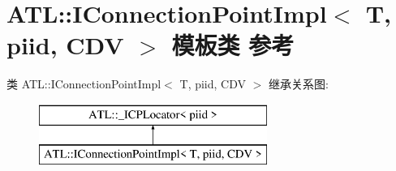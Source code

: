 \hypertarget{class_a_t_l_1_1_i_connection_point_impl}{}\section{A\+TL\+:\+:I\+Connection\+Point\+Impl$<$ T, piid, C\+DV $>$ 模板类 参考}
\label{class_a_t_l_1_1_i_connection_point_impl}
类 A\+TL\+:\+:I\+Connection\+Point\+Impl$<$ T, piid, C\+DV $>$ 继承关系图\+:\begin{figure}[H]
\begin{center}
\leavevmode
\includegraphics[height=2.000000cm]{class_a_t_l_1_1_i_connection_point_impl}
\end{center}
\end{figure}
